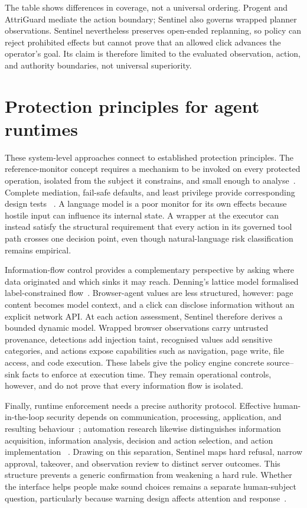 The table shows differences in coverage, not a universal ordering. Progent and
AttriGuard mediate the action boundary; Sentinel also
governs wrapped planner observations. Sentinel nevertheless preserves
open-ended replanning, so policy can reject prohibited effects but cannot prove
that an allowed click advances the operator's goal. Its claim is therefore
limited to the evaluated observation, action, and authority boundaries, not
universal superiority.

\section{Protection principles for agent runtimes}

These system-level approaches connect to established protection principles.
The reference-monitor concept requires a mechanism to be invoked on every
protected operation, isolated from the subject it constrains, and small enough
to analyse~\cite{anderson1972computersecurity}. Complete mediation, fail-safe
defaults, and least privilege provide corresponding design tests
~\cite{saltzer1975protection}. A language model is a poor monitor for its own
effects because hostile input can influence its internal state. A
wrapper at the executor can instead satisfy the structural requirement that
every action in its governed tool path crosses one decision point, even though
natural-language risk classification remains empirical.

Information-flow control provides a complementary perspective by asking where
data originated and which sinks it may reach. Denning's lattice model
formalised label-constrained flow~\cite{denning1976lattice}. Browser-agent
values are less structured, however: page content becomes model context, and a
click can disclose information without an explicit network API. At each action
assessment, Sentinel therefore derives a bounded dynamic model. Wrapped browser
observations carry untrusted provenance, detections add injection taint,
recognised values add sensitive categories, and actions expose capabilities
such as navigation, page write, file access, and code execution. These labels
give the policy engine concrete source--sink facts to enforce at execution
time. They remain operational controls, however, and do not prove that every
information flow is isolated.

Finally, runtime enforcement needs a precise authority protocol. Effective
human-in-the-loop security depends on communication, processing, application,
and resulting behaviour~\cite{cranor2008humanloop}; automation research
likewise distinguishes information acquisition, information analysis, decision
and action selection, and action implementation
~\cite{parasuraman2000automation}. Drawing on this separation, Sentinel maps
hard refusal, narrow approval, takeover, and observation review to distinct
server outcomes. This structure prevents a generic confirmation from weakening
a hard rule. Whether the interface helps people make sound choices remains a
separate human-subject question, particularly because warning design affects
attention and response~\cite{sunshine2009cryingwolf,akhawe2013warningland}.


